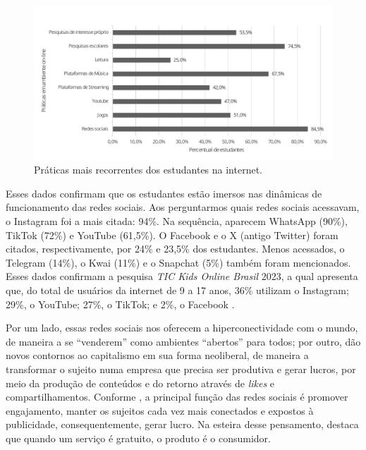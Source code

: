 \documentclass[portuguese]{textolivre}
\begin{document}
\begin{figure}
\centering
\begin{minipage}{0.85\linewidth}
\includegraphics[width=\linewidth]{Graf2.pdf}
\caption{Práticas mais recorrentes dos estudantes na internet.}
\label{fig2}
\end{minipage}
\end{figure}

Esses dados confirmam que os estudantes estão imersos nas dinâmicas de funcionamento das redes sociais. Aos perguntarmos quais redes sociais acessavam, o Instagram foi a mais citada: 94\%. Na sequência, aparecem WhatsApp (90\%), TikTok (72\%) e YouTube (61,5\%). O Facebook e o X (antigo Twitter) foram citados, respectivamente, por 24\% e 23,5\% dos estudantes. Menos acessados, o Telegram (14\%), o Kwai (11\%) e o Snapchat (5\%) também foram mencionados. Esses dados confirmam a pesquisa \textit{TIC Kids Online Brasil} 2023, a qual apresenta que, do total de usuários da internet de 9 a 17 anos, 36\% utilizam o Instagram; 29\%, o YouTube; 27\%, o TikTok; e 2\%, o Facebook \cite[p.~11]{centro_regional_de_estudos_para_o_desenvolvimento_da_sociedade_da_informacao_tic_2023}.

Por um lado, essas redes sociais nos oferecem a hiperconectividade com o mundo, de maneira a se ``venderem'' como ambientes ``abertos'' para todos; por outro, dão novos contornos ao capitalismo em sua forma neoliberal, de maneira a transformar o sujeito numa empresa que precisa ser produtiva e gerar lucros, por meio da produção de conteúdos e do retorno através de \textit{likes} e compartilhamentos. Conforme \textcite{lanier_dez_2018}, a principal função das redes sociais é promover engajamento, manter os sujeitos cada vez mais conectados e expostos à publicidade, consequentemente, gerar lucro. Na esteira desse pensamento, \textcite{vietri_community_2019} destaca que quando um serviço é gratuito, o produto é o consumidor.
\end{document}
